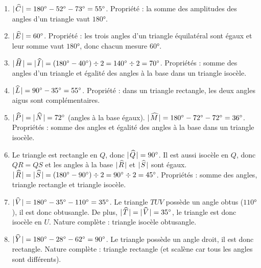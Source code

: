 \documentclass[../../syllabus_1.tex]{subfiles}
\begin{document}
\begin{solution}
    \begin{enumerate}
        \item $\lvert\mkern2mu\widehat{C}\mkern2mu\rvert = \ang{180} - \ang{52} - \ang{73} = \ang{55}$. Propriété : la somme des amplitudes des angles d'un triangle vaut $\ang{180}$.

        \item $\lvert\mkern2mu\widehat{E}\mkern2mu\rvert = \ang{60}$. Propriété : les trois angles d'un triangle équilatéral sont égaux et leur somme vaut $\ang{180}$, donc chacun mesure $\ang{60}$.

        \item $\lvert\mkern2mu\widehat{H}\mkern2mu\rvert = \lvert\mkern2mu\widehat{I}\mkern2mu\rvert = (\ang{180} - \ang{40}) \div 2 = \ang{140} \div 2 = \ang{70}$. Propriétés : somme des angles d'un triangle et égalité des angles à la base dans un triangle isocèle.

        \item $\lvert\mkern2mu\widehat{L}\mkern2mu\rvert = \ang{90} - \ang{35} = \ang{55}$. Propriété : dans un triangle rectangle, les deux angles aigus sont complémentaires.

        \item $\lvert\mkern2mu\widehat{P}\mkern2mu\rvert = \lvert\mkern2mu\widehat{N}\mkern2mu\rvert = \ang{72}$ (angles à la base égaux). $\lvert\mkern2mu\widehat{M}\mkern2mu\rvert = \ang{180} - \ang{72} - \ang{72} = \ang{36}$. Propriétés : somme des angles et égalité des angles à la base dans un triangle isocèle.

        \item Le triangle est rectangle en $Q$, donc $\lvert\mkern2mu\widehat{Q}\mkern2mu\rvert = \ang{90}$. Il est aussi isocèle en $Q$, donc $QR = QS$ et les angles à la base $\lvert\mkern2mu\widehat{R}\mkern2mu\rvert$ et $\lvert\mkern2mu\widehat{S}\mkern2mu\rvert$ sont égaux. $\lvert\mkern2mu\widehat{R}\mkern2mu\rvert = \lvert\mkern2mu\widehat{S}\mkern2mu\rvert = (\ang{180} - \ang{90}) \div 2 = \ang{90} \div 2 = \ang{45}$. Propriétés : somme des angles, triangle rectangle et triangle isocèle.

        \item $\lvert\mkern2mu\widehat{V}\mkern2mu\rvert = \ang{180} - \ang{35} - \ang{110} = \ang{35}$. Le triangle $TUV$ possède un angle obtus ($\ang{110}$), il est donc obtusangle. De plus, $\lvert\mkern2mu\widehat{T}\mkern2mu\rvert = \lvert\mkern2mu\widehat{V}\mkern2mu\rvert = \ang{35}$, le triangle est donc isocèle en $U$. Nature complète : triangle isocèle obtusangle.

        \item $\lvert\mkern2mu\widehat{Y}\mkern2mu\rvert = \ang{180} - \ang{28} - \ang{62} = \ang{90}$. Le triangle possède un angle droit, il est donc rectangle. Nature complète : triangle rectangle (et scalène car tous les angles sont différents).
    \end{enumerate}
\end{solution}
\end{document}
